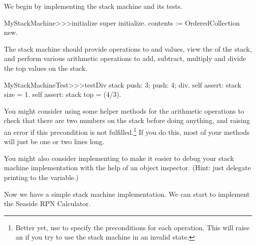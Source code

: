 \documentclass[a4paper,10pt,twoside]{book}
\begin{document}
We begin by implementing the stack machine and its tests.


\begin{code}{}
MyStackMachine>>>initialize
	super initialize.
	contents := OrderedCollection new.
\end{code}

The stack machine should provide operations to  and  values, view the  of the stack, and perform various arithmetic operations to add, subtract, multiply and divide the top values on the stack.


\begin{code}{}
MyStackMachineTest>>>testDiv
	stack
		push: 3;
		push: 4;
		div.
	self assert: stack size = 1.
	self assert: stack top = (4/3).
\end{code}

You might consider using some helper methods for the arithmetic operations to check that there are two numbers on the stack before doing anything, and raising an error if this precondition is not fulfilled.\footnote{Better yet, use  to specify the preconditions for each operation.
This will raise an  if you try to use the stack machine in an invalid state.}
If you do this, most  of your methods will just be one or two lines long.

You might also consider implementing  to make it easier to debug your stack machine implementation with the help of an object inspector.
(Hint: just delegate printing to the  variable.)


Now we have a simple stack machine implementation.
We can start to implement the Seaside RPN Calculator.
\end{document}
